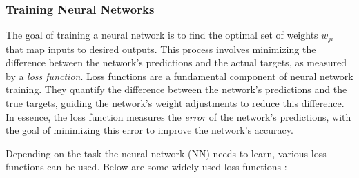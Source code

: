 \subsubsection*{Training Neural Networks}
The goal of training a neural network is to find the optimal set of weights $w_{ji}$ that map inputs to desired outputs. This process involves minimizing the difference between the network’s predictions and the actual targets, as measured by a \textit{loss function}.
Loss functions are a fundamental component of neural network training. They quantify the difference between the network's predictions and the true targets, guiding the network’s weight adjustments to reduce this difference. In essence, the loss function measures the \textit{error} of the network's predictions, with the goal of minimizing this error to improve the network's accuracy.

Depending on the task the neural network (NN) needs to learn, various loss functions can be used. Below are some widely used loss functions \cite{LF_review}:

